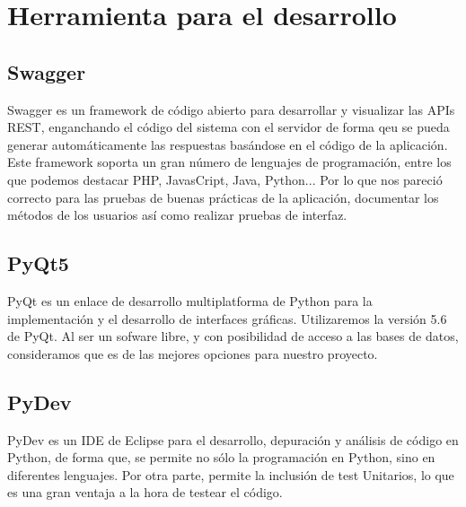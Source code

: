 \section{Herramienta para el desarrollo}
\subsection{Swagger}
Swagger es un framework de código abierto para desarrollar y visualizar las APIs REST, enganchando el código del sistema con el servidor de forma qeu se pueda generar automáticamente las respuestas basándose en el código de la aplicación. \nocite{wiki:swagger}
Este framework soporta un gran número de lenguajes de programación, entre los que podemos destacar PHP, JavasCript, Java, Python... Por lo que nos pareció correcto para las pruebas de buenas prácticas de la aplicación, documentar los métodos de los usuarios así como realizar pruebas de interfaz.\nocite{wiki:swagger} 

\subsection{PyQt5}
PyQt es un enlace de desarrollo multiplatforma de Python  \cite{python:pyqt} para la implementación y el desarrollo de interfaces gráficas. Utilizaremos la versión 5.6 de PyQt. Al ser un sofware libre, y con posibilidad de acceso a las bases de datos, consideramos que es de las mejores opciones para nuestro proyecto. \nocite{wiki:pyqt}

\subsection{PyDev}
PyDev es un IDE de Eclipse para el desarrollo, depuración y análisis de código en Python, de forma que, se permite no sólo  la programación en Python, sino en diferentes lenguajes. Por otra parte, permite la inclusión de test Unitarios, lo que es una gran ventaja a la hora de testear el código. 
